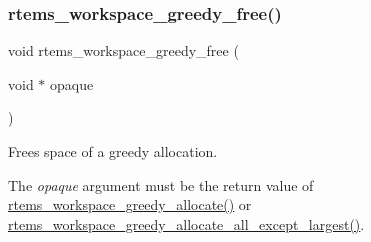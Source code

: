 \subsubsection{\texorpdfstring{rtems\_workspace\_greedy\_free()}{rtems\_workspace\_greedy\_free()}}
{\footnotesize\ttfamily void rtems\+\_\+workspace\+\_\+greedy\+\_\+free (\begin{DoxyParamCaption}\item[{void $\ast$}]{opaque }\end{DoxyParamCaption})}



Frees space of a greedy allocation. 

The {\itshape opaque} argument must be the return value of \mbox{\hyperlink{group__ClassicRTEMSWorkspace_gac04da5a16a78a69df042a654558aca2b}{rtems\+\_\+workspace\+\_\+greedy\+\_\+allocate()}} or \mbox{\hyperlink{group__ClassicRTEMSWorkspace_ga631bbb4b9c5dab3b7da64412e1a19c16}{rtems\+\_\+workspace\+\_\+greedy\+\_\+allocate\+\_\+all\+\_\+except\+\_\+largest()}}. 